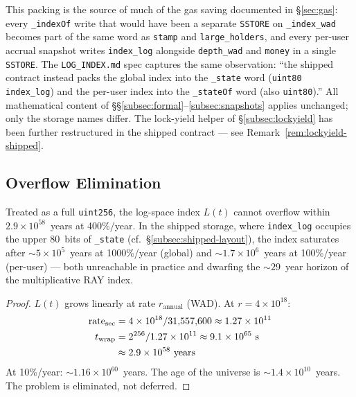 \documentclass[10pt,a4paper,twocolumn]{article}
\begin{document}
This packing is the source of much of the gas saving documented in \S\ref{sec:gas}: every \texttt{\_indexOf} write that would have been a separate \texttt{SSTORE} on \texttt{\_index\_wad} becomes part of the same word as \texttt{stamp} and \texttt{large\_holders}, and every per-user accrual snapshot writes \texttt{index\_log} alongside \texttt{depth\_wad} and \texttt{money} in a single \texttt{SSTORE}. The \texttt{LOG\_INDEX.md} spec captures the same observation: ``the shipped contract instead packs the global index into the \texttt{\_state} word (\texttt{uint80 index\_log}) and the per-user index into the \texttt{\_stateOf} word (also \texttt{uint80}).'' All mathematical content of \S\S\ref{subsec:formal}--\ref{subsec:snapshots} applies unchanged; only the storage names differ. The lock-yield helper of \S\ref{subsec:lockyield} has been further restructured in the shipped contract --- see Remark~\ref{rem:lockyield-shipped}.

\subsection{Overflow Elimination}
\label{subsec:overflow-elim}

\begin{theorem}
\label{thm:overflow}
Treated as a full \texttt{uint256}, the log-space index $L(t)$ cannot overflow within $2.9 \times 10^{58}$~years at 400\%/year. In the shipped storage, where \texttt{index\_log} occupies the upper 80~bits of \texttt{\_state} (cf.\ \S\ref{subsec:shipped-layout}), the index saturates after $\sim 5 \times 10^5$~years at 1000\%/year (global) and $\sim 1.7 \times 10^6$~years at 100\%/year (per-user) --- both unreachable in practice and dwarfing the $\sim 29$~year horizon of the multiplicative RAY index.
\end{theorem}

\begin{proof}
$L(t)$ grows linearly at rate $r_{\text{annual}}$ (WAD). At $r = 4 \times 10^{18}$:
\begin{align}
\text{rate}_{\text{sec}} &= 4 \times 10^{18} / 31{,}557{,}600 \approx 1.27 \times 10^{11} \notag \\
t_{\text{wrap}} &= 2^{256} / 1.27 \times 10^{11} \approx 9.1 \times 10^{65}\text{~s} \notag \\
&\approx 2.9 \times 10^{58}\text{~years}
\end{align}
At 10\%/year: ${\sim}1.16 \times 10^{60}$~years. The age of the universe is ${\sim}1.4 \times 10^{10}$~years. The problem is eliminated, not deferred.
\end{proof}
\end{document}
